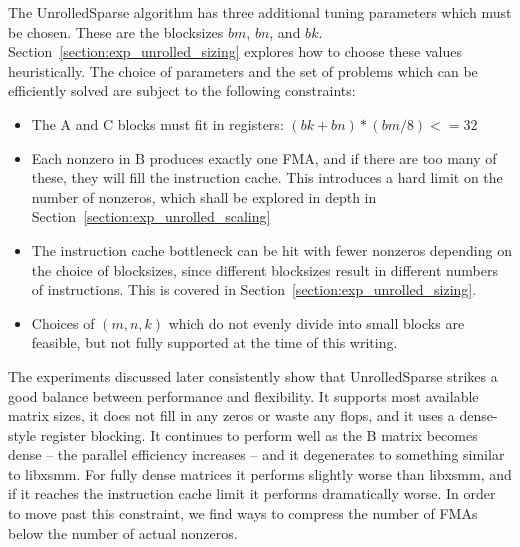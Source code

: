 The UnrolledSparse algorithm has three additional tuning parameters which must be chosen. These are the blocksizes $bm$, $bn$, and $bk$. Section~\ref{section:exp_unrolled_sizing} explores how to choose these values heuristically. The choice of parameters and the set of problems which can be efficiently solved are subject to the following constraints:

\begin{itemize}
  \item The A and C blocks must fit in registers: $(bk + bn) * (bm / 8) <= 32$
  
  \item Each nonzero in B produces exactly one FMA, and if there are too many of these, they will fill the instruction cache. This introduces a hard limit on the number of nonzeros, which shall be explored in depth in Section~\ref{section:exp_unrolled_scaling}
  
  \item The instruction cache bottleneck can be hit with fewer nonzeros depending on the choice of blocksizes, since different blocksizes result in different numbers of  instructions. This is covered in Section~\ref{section:exp_unrolled_sizing}.

  \item Choices of $(m,n,k)$ which do not evenly divide into small blocks are feasible, but not fully supported at the time of this writing.
\end{itemize}

The experiments discussed later consistently show that UnrolledSparse strikes a good balance between performance and flexibility. It supports most available matrix sizes, it does not fill in any zeros or waste any flops, and it uses a dense-style register blocking. It continues to perform well as the B matrix becomes dense -- the parallel efficiency increases -- and it degenerates to something similar to libxsmm. For fully dense matrices it performs slightly worse than libxsmm, and if it reaches the instruction cache limit it performs dramatically worse. In order to move past this constraint, we find ways to compress the number of FMAs below the number of actual nonzeros.

